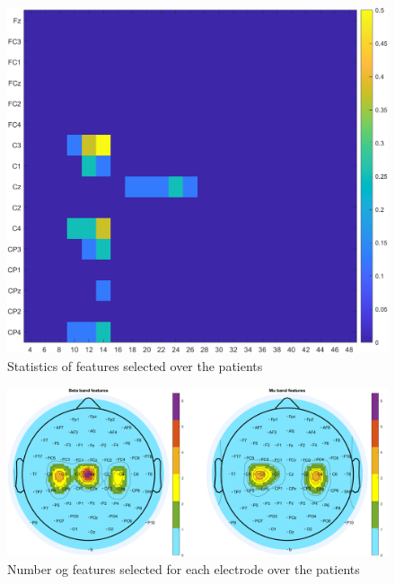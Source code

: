 \label{sec:results}

\begin{figure}
    \begin{center}
        \includegraphics[width=0.5\linewidth]{img/avg_selected_feature_n4features_autofilter.png}
    \end{center}

    \caption{Statistics of features selected over the patients}
    \label{fig:/avg_selected_feature_n4features_autofilter}
\end{figure}

\begin{figure}

\begin{center}
      \includegraphics[width=0.6\linewidth]{img/topoplot_electrodes_sel_features_beta_mu_band_n4features_64channelsmap.png}
\end{center}

    \caption{Number og features selected for each electrode over the patients}
    \label{fig:/avg_selected_feature_per_electrode_n4features_autofilter_channels64}
\end{figure}


